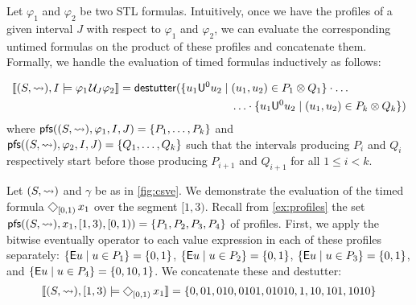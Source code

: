 Let $\varphi_1$ and $\varphi_2$ be two STL formulas.
Intuitively, once we have the profiles of a given interval $J$ with respect to $\varphi_1$ and $\varphi_2$, we can evaluate the corresponding untimed formulas on the product of these profiles and concatenate them.
Formally, we handle the evaluation of timed formulas inductively as follows:

\vspace{-1em}
\small
\begin{align*}
	\llbracket (S, {\hb}), I \models \varphi_1 \until_J \varphi_2 \rrbracket = \destutter( \{ u_1 \mathsf{U}^0 u_2 \st &(u_1, u_2) \in P_1 \otimes Q_1 \} \cdot \ldots \\ 
	&\ldots \cdot \{ u_1 \mathsf{U}^0 u_2 \st (u_1, u_2) \in P_k \otimes Q_k \} )
\end{align*}
\normalsize
where $\mathsf{pfs}((S,{\rightsquigarrow}), \varphi_1, I, J) = \{P_1, \ldots, P_k \}$ and $\mathsf{pfs}((S,{\rightsquigarrow}), \varphi_2, I, J) = \{Q_1, \ldots, Q_k \}$ such that the intervals producing $P_i$ and $Q_i$ respectively start before those producing $P_{i+1}$ and $Q_{i+1}$ for all $1 \leq i < k$.



\begin{example} \label{ex:timed}
	Let $(S, {\rightsquigarrow})$ and $\gamma$ be as in \cref{fig:csve}.
	We demonstrate the evaluation of the timed formula $\LTLeventually_{[0,1)} x_1$ over the segment $[1,3)$.
	Recall from \cref{ex:profiles} the set $\mathsf{pfs}((S,{\rightsquigarrow}), x_1, [1,3), [0,1)) = \{P_1, P_2, P_3, P_4\}$ of profiles.
	First, we apply the bitwise eventually operator to each value expression in each of these profiles separately:
	$\{ \mathsf{E} u \st u \in P_1 \} = \{ 0, 1 \}$, $\{ \mathsf{E} u \st u \in P_2 \} = \{ 0, 1 \}$, $\{ \mathsf{E} u \st u \in P_3 \} = \{ 0, 1 \}$, and $\{ \mathsf{E} u \st u \in P_4 \} = \{ 0, 10, 1 \}$.
	We concatenate these and destutter:
	\[ 	\llbracket (S, {\hb}), [1,3) \models \LTLeventually_{[0,1)} x_1 \rrbracket = \{ 0, 01, 010, 0101, 01010, 1, 10, 101, 1010 \}  \]
\end{example}

